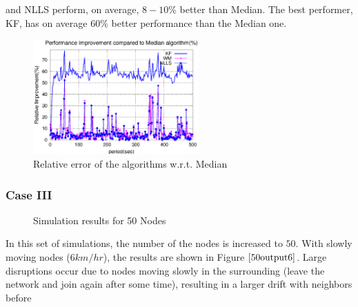 \documentclass[journal]{IEEEtran}
\begin{document}
and NLLS perform, on average, $8-10\%$ better than Median. The best
performer, KF, has on average $60\%$ better performance than the
Median one.
\begin{figure}
\centering \includegraphics[width=2.5in]{16output-error}
\caption{Relative error of the algorithms w.r.t. Median}
\label{16relerror}
\end{figure}
\subsubsection{\textbf{Case III}}
\begin{figure}
\centerline{  \hfil {}} \caption{Simulation results for 50 Nodes}
\label{50output}
\end{figure}
In this set of simulations, the number of the nodes is increased to
$50$. With slowly moving nodes ($6km/hr$), the results are shown in
Figure $\ref{50output6}$. Large disruptions occur due to nodes
moving slowly in the surrounding (leave the network and join again
after some time), resulting in a larger drift with neighbors before
\end{document}
